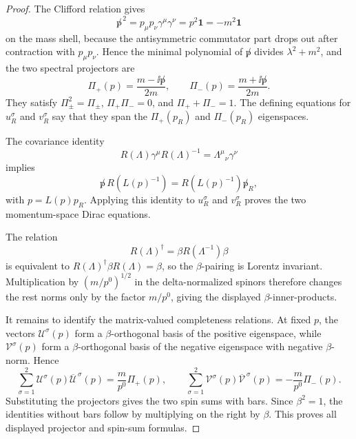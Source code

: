 \begin{proof}
The Clifford relation gives
\[
  \not p^{\,2}
  =
  p_\mu p_\nu\gamma^\mu\gamma^\nu
  =
  p^2\mathbf 1
  =
  -m^2\mathbf 1
\]
on the mass shell, because the antisymmetric commutator part drops out after
contraction with \(p_\mu p_\nu\). Hence the minimal polynomial of \(\not p\)
divides \(\lambda^2+m^2\), and the two spectral projectors are
\[
  \Pi_+(p)=\frac{m-\ii\not p}{2m},
  \qquad
  \Pi_-(p)=\frac{m+\ii\not p}{2m}.
\]
They satisfy \(\Pi_\pm^2=\Pi_\pm\), \(\Pi_+\Pi_-=0\), and
\(\Pi_++\Pi_-=1\).  The defining equations for \(u_R^\sigma\) and
\(v_R^\sigma\) say that they span the \(\Pi_+(p_R)\) and \(\Pi_-(p_R)\)
eigenspaces.

The covariance identity
\[
  R(\Lambda)\gamma^\mu R(\Lambda)^{-1}
  =
  \Lambda^\mu{}_\nu\gamma^\nu
\]
implies
\[
  \not p\,R(L(p)^{-1})=R(L(p)^{-1})\not p_R ,
\]
with \(p=L(p)p_R\).  Applying this identity to \(u_R^\sigma\) and
\(v_R^\sigma\) proves the two momentum-space Dirac equations.

The relation
\[
  R(\Lambda)^\dagger=\beta R(\Lambda^{-1})\beta
\]
is equivalent to \(R(\Lambda)^\dagger\beta R(\Lambda)=\beta\), so the
\(\beta\)-pairing is Lorentz invariant.  Multiplication by
\((m/p^0)^{1/2}\) in the delta-normalized spinors therefore changes the rest
norms only by the factor \(m/p^0\), giving the displayed
\(\beta\)-inner-products.

It remains to identify the matrix-valued completeness relations.  At fixed
\(p\), the vectors \(\mathcal U^\sigma(p)\) form a \(\beta\)-orthogonal basis
of the positive eigenspace, while \(\mathcal V^\sigma(p)\) form a
\(\beta\)-orthogonal basis of the negative eigenspace with negative
\(\beta\)-norm. Hence
\[
  \sum_{\sigma=1}^2
  \mathcal U^\sigma(p)\overline{\mathcal U}^{\,\sigma}(p)
  =
  \frac{m}{p^0}\Pi_+(p),
  \qquad
  \sum_{\sigma=1}^2
  \mathcal V^\sigma(p)\overline{\mathcal V}^{\,\sigma}(p)
  =
  -\frac{m}{p^0}\Pi_-(p).
\]
Substituting the projectors gives the two spin sums with bars. Since
\(\beta^2=1\), the identities without bars follow by multiplying on the right
by \(\beta\). This proves all displayed projector and spin-sum formulas.
\end{proof}

